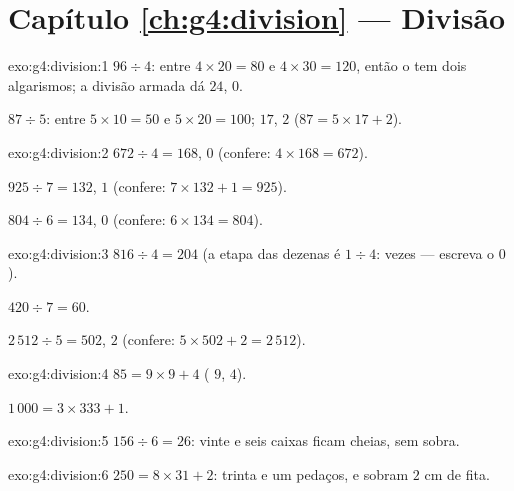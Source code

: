 \section*{Capítulo \ref{ch:g4:division} --- Divisão}

\begin{solution}{exo:g4:division:1}
$96 \div 4$: entre $4 \times 20 = 80$ e $4 \times 30 = 120$, então o
 tem dois algarismos; a divisão armada dá $24$,  $0$.

$87 \div 5$: entre $5 \times 10 = 50$ e $5 \times 20 = 100$;
 $17$,  $2$ ($87 = 5 \times 17 + 2$).
\end{solution}

\begin{solution}{exo:g4:division:2}
$672 \div 4 = 168$,  $0$ (confere: $4 \times 168 = 672$).

$925 \div 7 = 132$,  $1$ (confere:
$7 \times 132 + 1 = 925$).

$804 \div 6 = 134$,  $0$ (confere: $6 \times 134 = 804$).
\end{solution}

\begin{solution}{exo:g4:division:3}
$816 \div 4 = 204$ (a etapa das dezenas é $1 \div 4$:  vezes ---
escreva o $0$).

$420 \div 7 = 60$.

$2\,512 \div 5 = 502$,  $2$ (confere:
$5 \times 502 + 2 = 2\,512$).
\end{solution}

\begin{solution}{exo:g4:division:4}
$85 = 9 \times 9 + 4$ ( $9$,  $4$).

$1\,000 = 3 \times 333 + 1$.
\end{solution}

\begin{solution}{exo:g4:division:5}
$156 \div 6 = 26$: vinte e seis caixas ficam cheias, sem sobra.
\end{solution}

\begin{solution}{exo:g4:division:6}
$250 = 8 \times 31 + 2$: trinta e um pedaços, e sobram $2$ cm de
fita.
\end{solution}

